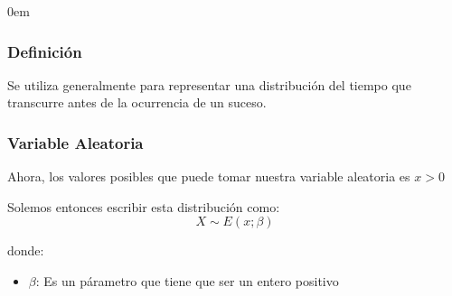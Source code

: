 \documentclass[12pt, fleqn]{report}                             %
\newenvironment{SmallIndentation}[1][0.75em]                    %
        {\begin{adjustwidth}{#1}{}\begin{footnotesize}}             %
        {\end{footnotesize}\end{adjustwidth}}                       %
\theoremstyle{break}                                            %
\begin{document}
                \begin{multicols}{2}
                \begin{SmallIndentation}[0em]


                    \subsubsection{Definición}

                        Se utiliza generalmente para representar una distribución del tiempo
                        que transcurre antes de la ocurrencia de un suceso.


                        \vspace{1em}
                        \subsubsection{Variable Aleatoria}

                            Ahora, los valores posibles que puede tomar nuestra variable aleatoria es
                            $x > 0$

                            Solemos entonces escribir esta distribución como:
                            \begin{equation*}
                                X \sim E(x; \beta)
                            \end{equation*}

                            donde:
                            \begin{itemize}
                                \item $\beta$: Es un párametro que tiene que ser un entero positivo
                            \end{itemize}



\end{SmallIndentation}
\end{multicols}
\end{document}

